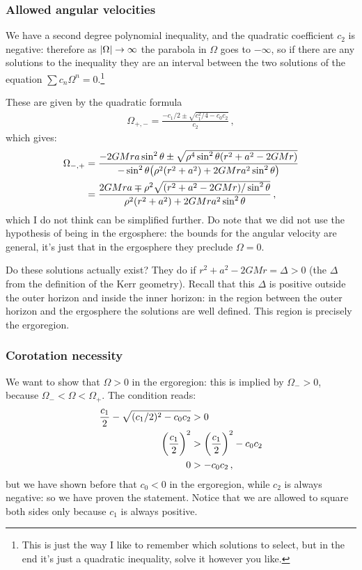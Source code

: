 \documentclass[main.tex]{subfiles}
\begin{document}
\subsubsection{Allowed angular velocities}

We have a second degree polynomial inequality, and the quadratic coefficient \(c_2 \) is negative: therefore as \(\abs{\Omega } \rightarrow \infty \) the parabola in \(\Omega \) goes to \(- \infty \), so if there are any solutions to the inequality they are an interval between the two solutions of the equation \(\sum c_{n} \Omega^{n} = 0\).\footnote{This is just the way I like to remember which solutions to select, but in the end it's just a quadratic inequality, solve it however you like.}

These are given by the quadratic formula 
%
\begin{align}
  \Omega_{+, -} = \frac{- c_1/2 \pm \sqrt{c_1^2/4- c_0 c_2  }}{c_2 }
\,,
\end{align}
%
which gives: 
%
\begin{subequations}
\begin{align}
\Omega_{-,+} &= \frac{-2GMra \sin^2\theta \pm \sqrt{\rho^4 \sin^{2}\theta \qty(r^2+a^2-2GMr)}}{- \sin^2\theta \qty(\rho^2(r^2+a^2)+2GMra^2 \sin^2\theta )}  \\
&= \frac{2GMra \mp \rho^2 \sqrt{ \qty(r^2+a^2-2GMr) / \sin^2 \theta }}{\rho^2(r^2+a^2)+2GMra^2 \sin^2\theta }
\,,
\end{align}
\end{subequations}
%
which I do not think can be simplified further. 
Do note that we did not use the hypothesis of being in the ergosphere: the bounds for the angular velocity are general, it's just that in the ergosphere they preclude \(\Omega = 0\). 

Do these solutions actually exist? They do if \(r^2+a^2-2GMr = \Delta >0\) (the \(\Delta \) from the definition of the Kerr geometry). Recall that this \(\Delta \) is positive outside the outer horizon and inside the inner horizon: in the region between the outer horizon and the ergosphere the solutions are well defined. 
This region is precisely the ergoregion. 

\subsubsection{Corotation necessity}

We want to show that \(\Omega>0\) in the ergoregion: this is implied by \(\Omega_{-} > 0\), because \(\Omega_{-} < \Omega < \Omega_{+}\). The condition reads: 
%
\begin{subequations}
\begin{align}
\frac{c_1}{2} - \sqrt{(c_1 /2)^2 - c_0 c_2 } &> 0  \\
\qty(\frac{c_1}{2})^2 &> \qty(\frac{c_1}{2})^2 - c_0 c_2   \\
0 &> -c_0 c_2 
\,,
\end{align}
\end{subequations}
%
but we have shown before that \(c_0 < 0\) in the ergoregion, while \(c_2 \) is always negative: so we have proven the statement. Notice that we are allowed to square both sides only because \(c_1 \) is always positive. 
\end{document}
